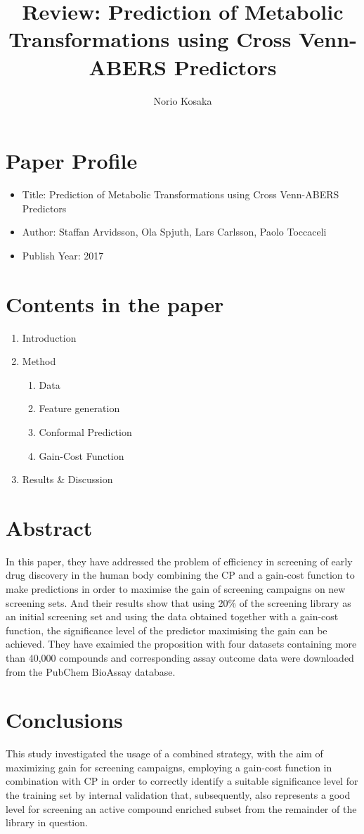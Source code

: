 \documentclass[10pt,a4paper]{article}
\author{Norio Kosaka}
\title{Review: Prediction of Metabolic Transformations using Cross Venn-ABERS Predictors}
\begin{document}
\maketitle

\section{Paper Profile}
\begin{itemize}
\item Title: Prediction of Metabolic Transformations using Cross Venn-ABERS Predictors
\item Author: Staffan Arvidsson, Ola Spjuth, Lars Carlsson, Paolo Toccaceli
\item Publish Year: 2017
\end{itemize}

\section{Contents in the paper}
\begin{enumerate}
\item Introduction
\item Method
\begin{enumerate}
    \item Data
    \item Feature generation
    \item Conformal Prediction
    \item Gain-Cost Function
\end{enumerate}
\item Results \& Discussion
\end{enumerate}

\section{Abstract}
In this paper, they have addressed the problem of efficiency in screening of early drug discovery in the human body combining the CP and a gain-cost function to make predictions in order to maximise the gain of screening campaigns on new screening sets. And their results show that using 20\% of the screening library as an initial screening set and using the data obtained together with a gain-cost function, the significance level of the predictor maximising the gain can be achieved. They have exaimied the proposition with four datasets containing more than 40,000 compounds and corresponding assay outcome data were downloaded from the PubChem BioAssay database.

\section{Conclusions}
This study investigated the usage of a combined strategy, with the aim of maximizing gain
for screening campaigns, employing a gain-cost function in combination with CP in order to
correctly identify a suitable significance level for the training set by internal validation that,
subsequently, also represents a good level for screening an active compound enriched subset
from the remainder of the library in question.

\medskip
 
\printbibliography
\end{document}
